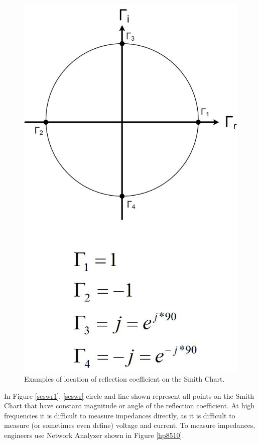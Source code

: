 \documentclass{ximera}
\begin{document}
\begin{figure}[htbp]
\begin{center}
\includegraphics[scale=0.3]{../jpg/Smith_Chart_Reflection_Coefficient.jpg}
\end{center}
\caption{Examples of location of reflection coefficient on the Smith Chart.}
\label{scex}
\end{figure}


In Figure \ref{scswr1}, \ref{scswr}  circle and line shown represent all points on the Smith Chart that have constant magnitude or angle of the reflection coefficient. At high frequencies it is difficult to measure impedances directly, as it is difficult to measure (or sometimes even define) voltage and current. 
To measure impedances, engineers use Network Analyzer shown in Figure \ref{hp8510}.
\end{document}
